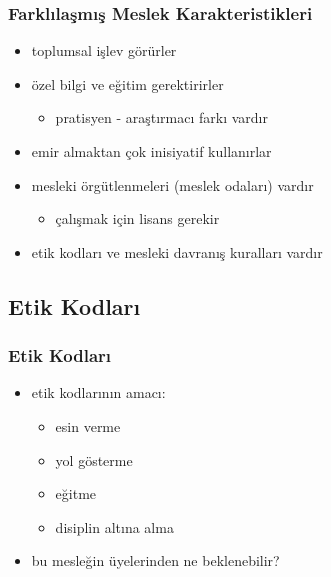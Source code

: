\documentclass[dvipsnames]{beamer}
\theoremstyle{definition}
\theoremstyle{example}
\theoremstyle{plain}
\begin{document}
\begin{frame}
  \frametitle{Farklılaşmış Meslek Karakteristikleri}

  \begin{itemize}
    \item toplumsal işlev görürler

    \pause
    \item özel bilgi ve eğitim gerektirirler
    \begin{itemize}
      \item pratisyen - araştırmacı farkı vardır
    \end{itemize}

    \pause
    \item emir almaktan çok inisiyatif kullanırlar

    \pause
    \item mesleki örgütlenmeleri (meslek odaları) vardır
    \begin{itemize}
      \item çalışmak için lisans gerekir
    \end{itemize}

    \pause
    \item etik kodları ve mesleki davranış kuralları vardır
  \end{itemize}
\end{frame}

\subsection{Etik Kodları}

\begin{frame}
  \frametitle{Etik Kodları}

  \begin{itemize}
    \item etik kodlarının amacı:

    \begin{itemize}
      \item esin verme
      \item yol gösterme
      \item eğitme
      \item disiplin altına alma
    \end{itemize}

    \pause
    \item bu mesleğin üyelerinden ne beklenebilir?
  \end{itemize}
\end{frame}
\end{document}
